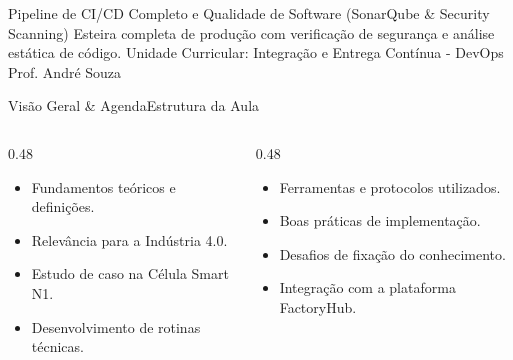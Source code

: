 
\senaicover
  {Pipeline de CI/CD Completo e Qualidade de Software (SonarQube & Security Scanning)}
  {Esteira completa de produção com verificação de segurança e análise estática de código.}
  {Unidade Curricular: Integração e Entrega Contínua - DevOps}
  {Prof. André Souza}

\begin{senaiframe}{Visão Geral \& Agenda}{Estrutura da Aula}
  \begin{columns}[t]
    \begin{column}{0.48\textwidth}
      \begin{tcolorbox}[senaibluecard, title={1. Conceitos Chave}]
        \begin{itemize}
          \item Fundamentos teóricos e definições.
          \item Relevância para a Indústria 4.0.
        \end{itemize}
      \end{tcolorbox}
      \vspace{4pt}
      \begin{tcolorbox}[senaiambercard, title={3. Aplicação Prática}]
        \begin{itemize}
          \item Estudo de caso na Célula Smart N1.
          \item Desenvolvimento de rotinas técnicas.
        \end{itemize}
      \end{tcolorbox}
    \end{column}
    \begin{column}{0.48\textwidth}
      \begin{tcolorbox}[senairedcard, title={2. Detalhamento Técnico}]
        \begin{itemize}
          \item Ferramentas e protocolos utilizados.
          \item Boas práticas de implementação.
        \end{itemize}
      \end{tcolorbox}
      \vspace{4pt}
      \begin{tcolorbox}[senaigreencard, title={4. Exercícios \& Avaliação}]
        \begin{itemize}
          \item Desafios de fixação do conhecimento.
          \item Integração com a plataforma FactoryHub.
        \end{itemize}
      \end{tcolorbox}
    \end{column}
  \end{columns}
\end{senaiframe}

